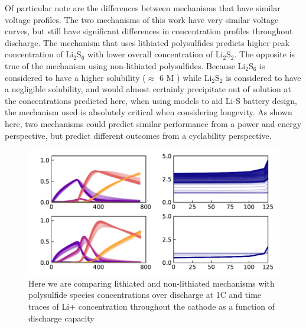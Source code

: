 \documentclass{elsarticle}
\begin{document}
Of particular note are the differences between mechanisms that have similar voltage profiles. The two mechanisms of this work have very similar voltage curves, but still have significant differences in concentration profiles throughout discharge. The mechanism that uses lithiated polysulfides predicts higher peak concentration of $\mathrm{Li}_2\mathrm{S}_6$ with lower overall concentration of $\mathrm{Li}_2\mathrm{S}_2$. The opposite is true of the mechanism using non-lithiated polysulfides. Because $\mathrm{Li}_2\mathrm{S}_6$ is considered to have a higher solubility ($\approx$ 6 M \cite{ANDREI2018469}) while $\mathrm{Li}_2\mathrm{S}_2$ is considered to have a negligible solubility, and would almost certainly precipitate out of solution at the concentrations predicted here, when using models to aid Li-S battery design, the mechanism used is absolutely critical when considering longevity. As shown here, two mechanisms could predict similar performance from a power and energy perspective, but predict different outcomes from a cyclability perspective.

\begin{center}
\begin{figure}[b!]
    \centering
    \includegraphics[width=\textwidth]{Figures/Figure5_PolysulfideMechComparison.pdf}
    \caption{Here we are comparing lithiated and non-lithiated mechanisms with polysulfide species concentrations over discharge at 1C and time traces of Li+ concentration throughout the cathode as a function of discharge capacity}
    \label{fig:mechanismcomparisonconc}
\end{figure}
\end{center}
\end{document}
